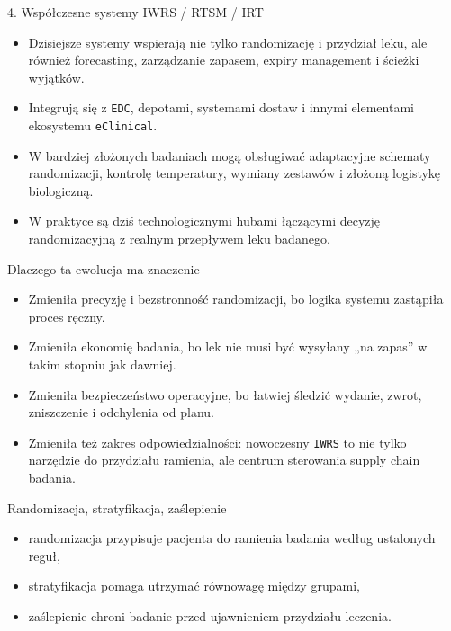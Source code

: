 \begin{frame}{4. Współczesne systemy IWRS / RTSM / IRT}
  \begin{itemize}
    \item Dzisiejsze systemy wspierają nie tylko randomizację i przydział leku, ale również forecasting, zarządzanie zapasem, expiry management i ścieżki wyjątków.
    \item Integrują się z \texttt{EDC}, depotami, systemami dostaw i innymi elementami ekosystemu \texttt{eClinical}.
    \item W bardziej złożonych badaniach mogą obsługiwać adaptacyjne schematy randomizacji, kontrolę temperatury, wymiany zestawów i złożoną logistykę biologiczną.
    \item W praktyce są dziś technologicznymi hubami łączącymi decyzję randomizacyjną z realnym przepływem leku badanego.
  \end{itemize}
\end{frame}

\begin{frame}{Dlaczego ta ewolucja ma znaczenie}
  \begin{itemize}
    \item Zmieniła precyzję i bezstronność randomizacji, bo logika systemu zastąpiła proces ręczny.
    \item Zmieniła ekonomię badania, bo lek nie musi być wysyłany „na zapas” w takim stopniu jak dawniej.
    \item Zmieniła bezpieczeństwo operacyjne, bo łatwiej śledzić wydanie, zwrot, zniszczenie i odchylenia od planu.
    \item Zmieniła też zakres odpowiedzialności: nowoczesny \texttt{IWRS} to nie tylko narzędzie do przydziału ramienia, ale centrum sterowania supply chain badania.
  \end{itemize}
\end{frame}

\begin{frame}{Randomizacja, stratyfikacja, zaślepienie}
  \begin{itemize}
    \item randomizacja przypisuje pacjenta do ramienia badania według ustalonych reguł,
    \item stratyfikacja pomaga utrzymać równowagę między grupami,
    \item zaślepienie chroni badanie przed ujawnieniem przydziału leczenia.
  \end{itemize}
\end{frame}


